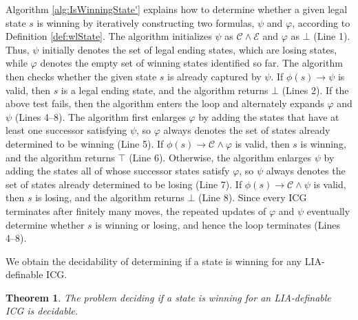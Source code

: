 \documentclass[review]{elsarticle}
\newcommand{\true}{\top}
\newcommand{\false}{\bot}
\newcommand{\constraint}{\mathcal{C}}
\newcommand{\estate}{\mathcal{E}}
\newcommand{\red}{\color{red}}
\newtheorem{theorem}{Theorem}
\begin{document}
	{\red
	Algorithm \ref{alg:IsWinningState'} explains how to determine whether a given legal state $s$ is winning by iteratively constructing two formulas, $\psi$ and $\varphi$, according to Definition \ref{def:wlState}.
	The algorithm initializes $\psi$ as $\constraint \land \estate$ and $\varphi$ as $\false$ (Line 1).
	Thus, $\psi$ initially denotes the set of legal ending states, which are losing states, while $\varphi$ denotes the empty set of winning states identified so far.
	The algorithm then checks whether the given state $s$ is already captured by $\psi$.
	If $\phi(s) \rightarrow \psi$ is valid, then $s$ is a legal ending state, and the algorithm returns $\false$ (Lines 2).
	If the above test fails, then the algorithm enters the loop and alternately expands $\varphi$ and $\psi$ (Lines 4--8).
	The algorithm first enlarges $\varphi$ by adding the states that have at least one successor satisfying $\psi$, so $\varphi$ always denotes the set of states already determined to be winning (Line 5).
	If $\phi(s) \rightarrow \constraint \land \varphi$ is valid, then $s$ is winning, and the algorithm returns $\true$ (Line 6).
	Otherwise, the algorithm enlarges $\psi$ by adding the states all of whose successor states satisfy $\varphi$, so $\psi$ always denotes the set of states already determined to be losing (Line 7).
	If $\phi(s) \rightarrow \constraint \land \psi$ is valid, then $s$ is losing, and the algorithm returns $\false$ (Line 8).
	Since every ICG terminates after finitely many moves, the repeated updates of $\varphi$ and $\psi$ eventually determine whether $s$ is winning or losing, and hence the loop terminates (Lines 4--8).
	}



	We obtain the decidability of determining if a state is winning for any LIA-definable ICG.

	\begin{theorem} \label{thm:isWinState}
    	The problem deciding if a state is winning for an LIA-definable ICG is decidable.
    \end{theorem}
\end{document}
